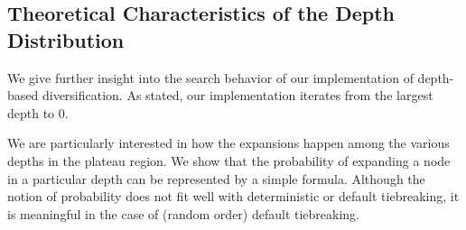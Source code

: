 


\subsection{Theoretical Characteristics of the Depth Distribution}

We give further insight into the search behavior of our implementation
of depth-based diversification.
As stated, our implementation iterates from the largest depth to 0.

We are particularly interested in how the expansions happen among the
various depths in the plateau region.
We show that the probability of expanding a node in a particular depth
can be represented by a simple formula.  Although the notion of
probability does not fit well with deterministic \fifo or \lifo
default tiebreaking, it is meaningful in the case of \ro (random
order) default tiebreaking.


